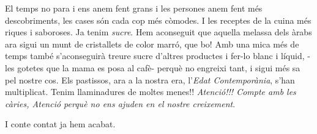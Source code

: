 \begin{news}
El temps no para i ens anem fent grans i les persones anem fent més descobriments, les cases són cada cop més còmodes. I les receptes de la cuina més riques i saboroses. Ja tenim \emph{sucre}. Hem aconseguit que  aquella melassa dels àrabs ara sigui un munt de cristallets de color marró, que bo! Amb una mica més de temps també s’aconseguirà treure sucre d’altres productes i fer-lo blanc i líquid, -les gotetes que la mama es posa al cafè- perquè no engreixi tant, i sigui més sa pel nostre cos. Els pastissos, ara a la nostra era, l’\emph{Edat Contemporània}, s’han multiplicat. Tenim llaminadures de moltes menes!! \emph{Atenció!!! Compte amb les càries, Atenció perquè no ens ajuden en el nostre creixement}.

I conte contat ja hem acabat. 
  
\end{news}
